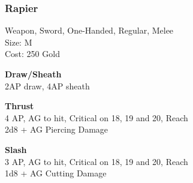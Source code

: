 \subsubsection{Rapier}\label{weapon:rapier}
Weapon, Sword, One-Handed, Regular, Melee\\
Size: M\\
Cost: 250 Gold

\textbf{Draw/Sheath}\\
2AP draw, 4AP sheath

\textbf{Thrust}\\
4 AP, AG to hit, Critical on 18, 19 and 20,  Reach\\
2d8 + \texttimes AG Piercing Damage

\textbf{Slash}\\
3 AP, AG to hit, Critical on 18, 19 and 20,  Reach\\
1d8 + \texttimes AG Cutting Damage